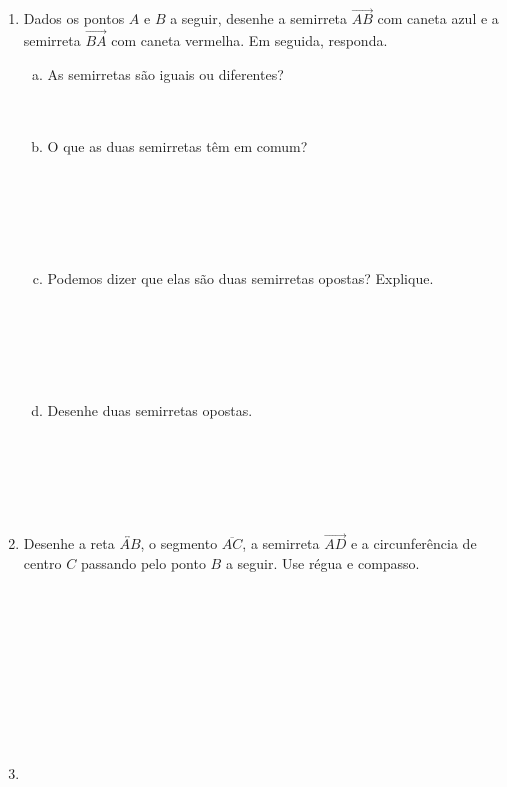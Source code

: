 \documentclass[a4paper,14pt]{article}
\begin{document}
    \begin{multicols}{2}
    	\begin{enumerate}
   			\item Dados os pontos $A$ e $B$ a seguir, desenhe a semirreta $\overrightarrow{AB}$ com caneta azul e a semirreta $\overrightarrow{BA}$ com caneta vermelha. Em seguida, responda.
   			\begin{enumerate}[a)]
   				\item As semirretas são iguais ou diferentes? \\\\\\
   				\item O que as duas semirretas têm em comum? \\\\\\\\\\\\
   				\item Podemos dizer que elas são duas semirretas opostas? Explique.  \\\\\\\\\\\\
   				\item Desenhe duas semirretas opostas. \\\\\\\\\\\\
   			\end{enumerate}
   			\item Desenhe a reta $\overleftrightarrow{AB}$, o segmento $\overline{AC}$, a semirreta $\overrightarrow{AD}$ e a circunferência de centro $C$ passando pelo ponto $B$ a seguir. Use régua e compasso. \\\\\\\\\\\\\\\\\\\\
   			\item \begin{enumerate}[a)]

\end{enumerate}
\end{enumerate}
\end{multicols}
\end{document}
